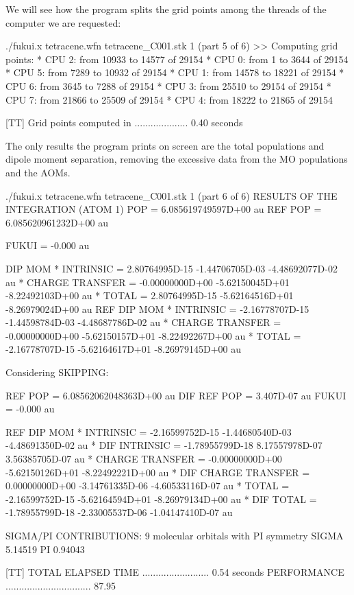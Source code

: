 \documentclass[a4paper,11pt,openany]{memoir}
\begin{document}
We will see how the program splits the grid points among the threads of the computer we are requested:
\begin{consola}{./fukui.x tetracene.wfn tetracene\_C001.stk 1 (part 5 of 6)}
>> Computing grid points:
* CPU 2: from 10933 to 14577 of 29154
* CPU 0: from 1 to 3644 of 29154
* CPU 5: from 7289 to 10932 of 29154
* CPU 1: from 14578 to 18221 of 29154
* CPU 6: from 3645 to 7288 of 29154
* CPU 3: from 25510 to 29154 of 29154
* CPU 7: from 21866 to 25509 of 29154
* CPU 4: from 18222 to 21865 of 29154

[TT] Grid points computed in .................... 0.40 seconds
\end{consola}
The only results the program prints on screen are the total populations and dipole moment separation, removing the excessive data from the \ac{MO} populations and the \acp{AOM}.
\begin{consola}{./fukui.x tetracene.wfn tetracene\_C001.stk 1 (part 6 of 6)}
RESULTS OF THE INTEGRATION (ATOM 1)
POP               =      6.085619749597D+00 au
REF POP           =      6.085620961232D+00 au

FUKUI = -0.000 au


DIP MOM
* INTRINSIC       =    2.80764995D-15   -1.44706705D-03   -4.48692077D-02  au
* CHARGE TRANSFER =   -0.00000000D+00   -5.62150045D+01   -8.22492103D+00  au
* TOTAL           =    2.80764995D-15   -5.62164516D+01   -8.26979024D+00  au
REF DIP MOM
* INTRINSIC       =   -2.16778707D-15   -1.44598784D-03   -4.48687786D-02  au
* CHARGE TRANSFER =   -0.00000000D+00   -5.62150157D+01   -8.22492267D+00  au
* TOTAL           =   -2.16778707D-15   -5.62164617D+01   -8.26979145D+00  au

Considering SKIPPING:

REF POP   =     6.08562062048363D+00 au
DIF REF POP = 3.407D-07 au
FUKUI = -0.000 au

REF DIP MOM
* INTRINSIC       =   -2.16599752D-15   -1.44680540D-03   -4.48691350D-02  au
* DIF INTRINSIC   =   -1.78955799D-18    8.17557978D-07    3.56385705D-07  au
* CHARGE TRANSFER     =   -0.00000000D+00   -5.62150126D+01   -8.22492221D+00  au
* DIF CHARGE TRANSFER =    0.00000000D+00   -3.14761335D-06   -4.60533116D-07  au
* TOTAL           =   -2.16599752D-15   -5.62164594D+01   -8.26979134D+00  au
* DIF TOTAL       =   -1.78955799D-18   -2.33005537D-06   -1.04147410D-07  au

SIGMA/PI CONTRIBUTIONS:     9 molecular orbitals with PI symmetry
SIGMA   5.14519     PI   0.94043

[TT] TOTAL ELAPSED TIME ......................... 0.54 seconds
PERFORMANCE ................................ 87.95%
\end{consola}
\end{document}
